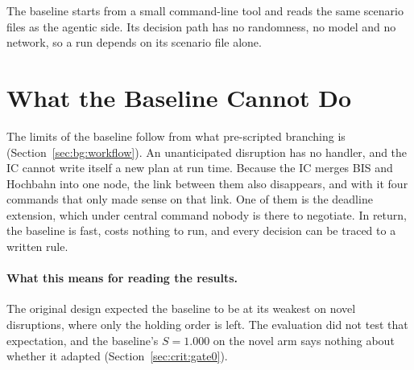 The baseline starts from a small command-line tool and reads the same scenario
files as the agentic side. Its decision path has no randomness, no model and
no network, so a run depends on its scenario file alone.

\section{What the Baseline Cannot Do}
\label{sec:wf:limits}

The limits of the baseline follow from what pre-scripted branching is
(Section~\ref{sec:bg:workflow}). An unanticipated disruption has no handler,
and the IC cannot write itself a new plan at run time. Because the IC merges
BIS and Hochbahn into one node, the link between them also disappears, and with
it four commands that only made sense on that link. One of them is the deadline
extension, which under central command nobody is there to negotiate. In return, the
baseline is fast, costs nothing to run, and every decision can be traced to a
written rule.

\paragraph{What this means for reading the results.} The original design
expected the baseline to be at its weakest on novel disruptions, where only the
holding order is left. The evaluation did not test that expectation, and the
baseline's $S = 1.000$ on the novel arm says nothing about whether it adapted
(Section~\ref{sec:crit:gate0}).
